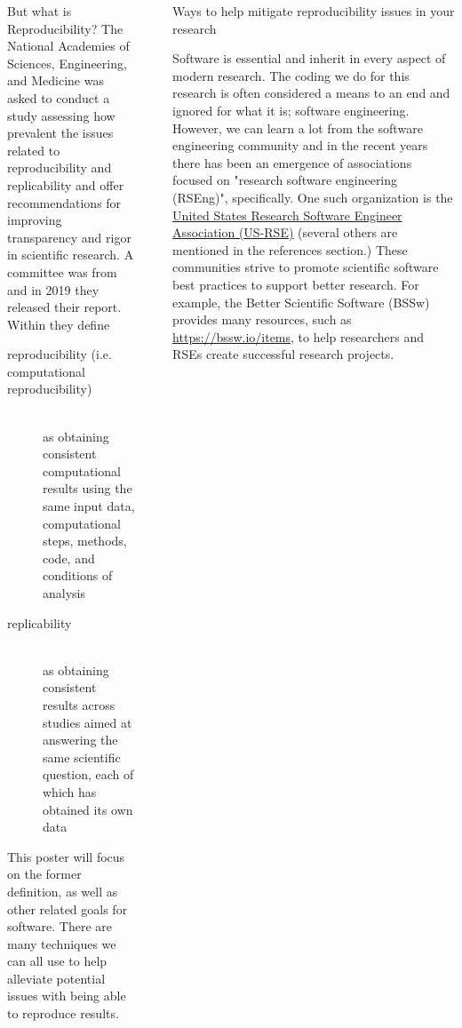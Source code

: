 \documentclass[final]{beamer}
\newlength{\sepwidth}
\newlength{\colwidth}
\newcommand{\separatorcolumn}{\begin{column}{\sepwidth}\end{column}}
\begin{document}
\begin{frame}[t]
\begin{columns}[t]
\begin{column}{\colwidth}
  \begin{block}{But what is Reproducibility?}
    The National Academies of Sciences, Engineering, and Medicine was asked to
    conduct a study assessing how prevalent the issues related to
    reproducibility and replicability and offer recommendations for improving
    transparency and rigor in scientific research.
    A committee was from and in 2019 they released their
    report\cite{reproducibility_in_science}.
    Within they define
    \begin{description}
      \item[reproducibility (i.e. computational reproducibility)] \hfill \\
      as obtaining consistent computational results using the same input data,
      computational steps, methods, code, and conditions of analysis
      \item[replicability] \hfill \\
      as obtaining consistent results across studies aimed at answering the same
      scientific question, each of which has obtained its own data
    \end{description}

    This poster will focus on the former definition, as well as other related
    goals for software.
    There are many techniques we can all use to help alleviate potential issues
    with being able to reproduce results.

  \end{block}

\end{column}

\separatorcolumn

\begin{column}{\colwidth}

  \begin{exampleblock}{Ways to help mitigate reproducibility issues in your research}

    Software is essential and inherit in every aspect of modern research.
    The coding we do for this research is often considered a means to an end 
    and ignored for what it is; software engineering.
    However, we can learn a lot from the software engineering community and
    in the recent years there has been an emergence of associations focused on 
    "research software engineering (RSEng)", specifically.
    One such organization is the
    \href{https://us-rse.org}{United States Research Software Engineer Association (US-RSE)}
    \cite{us-rse} (several others are mentioned in the references section.)
    These communities strive to promote scientific software best practices to
    support better research.
    For example, the Better Scientific Software (BSSw)\cite{bssw} provides many
    resources, such as
    \href{https://bssw.io/items?topic=reproducibility}{https://bssw.io/items},
    to help researchers and RSEs create successful research projects.


\end{exampleblock}
\end{column}
\end{columns}
\end{frame}
\end{document}
